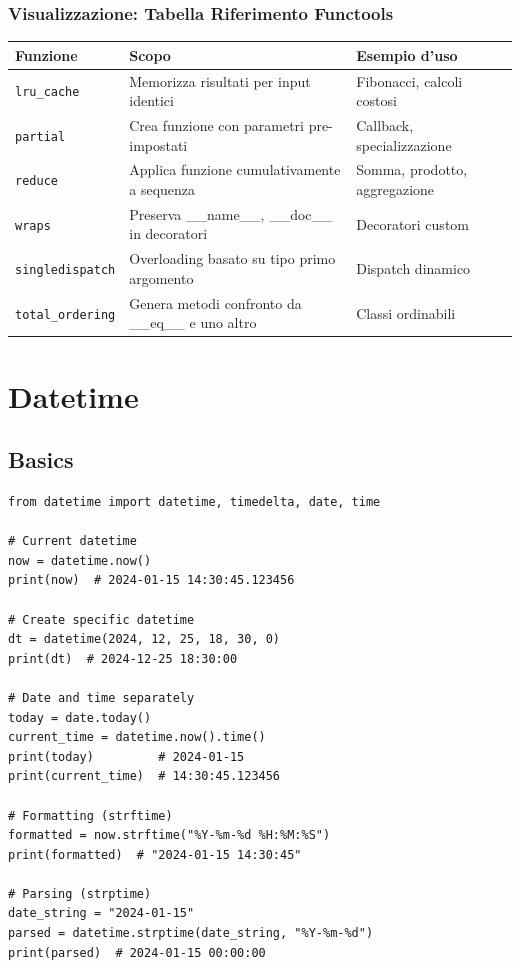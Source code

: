 \subsubsection{Visualizzazione: Tabella Riferimento Functools}

\begin{center}
\begin{tabular}{|l|p{5cm}|p{4cm}|}
\hline
\textbf{Funzione} & \textbf{Scopo} & \textbf{Esempio d'uso} \\
\hline
\texttt{lru\_cache} & Memorizza risultati per input identici & Fibonacci, calcoli costosi \\
\hline
\texttt{partial} & Crea funzione con parametri pre-impostati & Callback, specializzazione \\
\hline
\texttt{reduce} & Applica funzione cumulativamente a sequenza & Somma, prodotto, aggregazione \\
\hline
\texttt{wraps} & Preserva \_\_name\_\_, \_\_doc\_\_ in decoratori & Decoratori custom \\
\hline
\texttt{singledispatch} & Overloading basato su tipo primo argomento & Dispatch dinamico \\
\hline
\texttt{total\_ordering} & Genera metodi confronto da \_\_eq\_\_ e uno altro & Classi ordinabili \\
\hline
\end{tabular}
\end{center}

\section{Datetime}

\subsection{Basics}

\begin{lstlisting}
from datetime import datetime, timedelta, date, time

# Current datetime
now = datetime.now()
print(now)  # 2024-01-15 14:30:45.123456

# Create specific datetime
dt = datetime(2024, 12, 25, 18, 30, 0)
print(dt)  # 2024-12-25 18:30:00

# Date and time separately
today = date.today()
current_time = datetime.now().time()
print(today)         # 2024-01-15
print(current_time)  # 14:30:45.123456

# Formatting (strftime)
formatted = now.strftime("%Y-%m-%d %H:%M:%S")
print(formatted)  # "2024-01-15 14:30:45"

# Parsing (strptime)
date_string = "2024-01-15"
parsed = datetime.strptime(date_string, "%Y-%m-%d")
print(parsed)  # 2024-01-15 00:00:00
\end{lstlisting}

